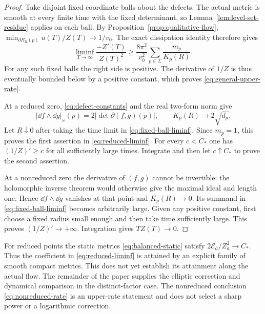 \begin{proof}
Take disjoint fixed coordinate balls about the defects.
The actual metric is smooth at every finite time with
the fixed determinant, so Lemma~\ref{lem:level-set-residue}
applies on each ball. By
Proposition~\ref{prop:qualitative-flow},
$\min_{\partial B_R(p)}u(T)/Z(T)\to1/v_0$.
The exact dissipation identity therefore gives
\begin{equation}\label{eq:fixed-ball-liminf}
 \liminf_{T\to\infty}\frac{-Z'(T)}{Z(T)^2}
       \ge\frac{8\pi^2}{v_0^2}
                          \sum_{p\in\Sigma}\frac{m_p}{K_p(R)}.
\end{equation}
For any such fixed balls the right side is positive.
The derivative of $1/Z$ is thus eventually bounded
below by a positive constant, which proves
\eqref{eq:general-upper-rate}.

At a reduced zero, \eqref{eq:defect-constants} and
the real two-form norm give
\[
 |\dd f\wedge\dd g|_\omega(p)
       =2|\det\partial(f,g)(p)|,\qquad
                 K_p(R)\longrightarrow2\sqrt{d_p}.
\]
Let $R\downarrow0$ after taking the time limit in
\eqref{eq:fixed-ball-liminf}. Since $m_p=1$, this
proves the first assertion in \eqref{eq:reduced-liminf}.
For every $c<C_*$ one has $(1/Z)'\ge c$ for all
sufficiently large times. Integrate and then let
$c\uparrow C_*$ to prove the second assertion.

At a nonreduced zero the derivative of $(f,g)$ cannot
be invertible: the holomorphic inverse theorem would
otherwise give the maximal ideal and length one.
Hence $\dd f\wedge\dd g$ vanishes at that point and
$K_p(R)\to0$. Its summand in
\eqref{eq:fixed-ball-liminf} becomes arbitrarily large.
Given any positive constant, first choose a fixed
radius small enough and then take time sufficiently
large. This proves $(1/Z)'\to+\infty$.
Integration gives $TZ(T)\to0$.
\end{proof}

For reduced points the static metrics
\eqref{eq:balanced-static} satisfy
$2\mathcal E_a/Z_a^2\to C_*$. Thus the coefficient in
\eqref{eq:reduced-liminf} is attained by an explicit
family of smooth compact metrics. This does not yet
establish its attainment along the actual flow. The
remainder of the paper supplies the elliptic correction
and dynamical comparison in the distinct-factor case.
The nonreduced conclusion \eqref{eq:nonreduced-rate}
is an upper-rate statement and does not select a sharp
power or a logarithmic correction.
